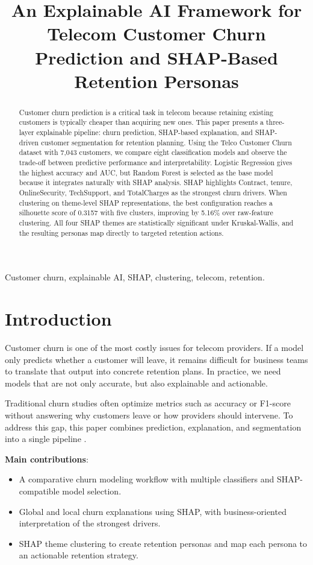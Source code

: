 \documentclass[conference]{IEEEtran}
\title{An Explainable AI Framework for Telecom Customer Churn Prediction and SHAP-Based Retention Personas}
\author{
\IEEEauthorblockN{Vũ Trung Kiên}
\IEEEauthorblockA{Department of Data Science\\University of Information Technology\\Ho Chi Minh City, Vietnam\\Email: student@uit.edu.vn}
}
\begin{document}
\maketitle

\begin{abstract}
Customer churn prediction is a critical task in telecom because retaining existing customers is typically cheaper than acquiring new ones. This paper presents a three-layer explainable pipeline: churn prediction, SHAP-based explanation, and SHAP-driven customer segmentation for retention planning. Using the Telco Customer Churn dataset with 7,043 customers, we compare eight classification models and observe the trade-off between predictive performance and interpretability. Logistic Regression gives the highest accuracy and AUC, but Random Forest is selected as the base model because it integrates naturally with SHAP analysis. SHAP highlights Contract, tenure, OnlineSecurity, TechSupport, and TotalCharges as the strongest churn drivers. When clustering on theme-level SHAP representations, the best configuration reaches a silhouette score of 0.3157 with five clusters, improving by 5.16\% over raw-feature clustering. All four SHAP themes are statistically significant under Kruskal-Wallis, and the resulting personas map directly to targeted retention actions.
\end{abstract}

\begin{IEEEkeywords}
Customer churn, explainable AI, SHAP, clustering, telecom, retention.
\end{IEEEkeywords}

\section{Introduction}
Customer churn is one of the most costly issues for telecom providers. If a model only predicts whether a customer will leave, it remains difficult for business teams to translate that output into concrete retention plans. In practice, we need models that are not only accurate, but also explainable and actionable.

Traditional churn studies often optimize metrics such as accuracy or F1-score without answering why customers leave or how providers should intervene. To address this gap, this paper combines prediction, explanation, and segmentation into a single pipeline \cite{alam2020customer, lundberg2017unified, breiman2001random}.

\textbf{Main contributions}:
\begin{itemize}[leftmargin=*]
    \item A comparative churn modeling workflow with multiple classifiers and SHAP-compatible model selection.
    \item Global and local churn explanations using SHAP, with business-oriented interpretation of the strongest drivers.
    \item SHAP theme clustering to create retention personas and map each persona to an actionable retention strategy.
\end{itemize}
\end{document}
